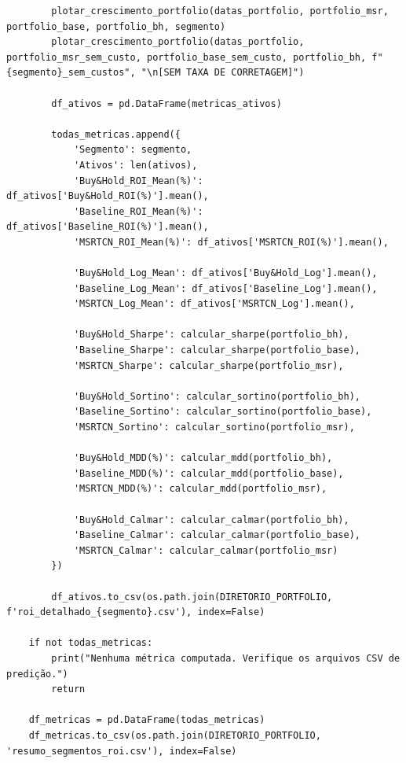 \documentclass{article}
\begin{document}
\begin{verbatim}
        plotar_crescimento_portfolio(datas_portfolio, portfolio_msr, portfolio_base, portfolio_bh, segmento)
        plotar_crescimento_portfolio(datas_portfolio, portfolio_msr_sem_custo, portfolio_base_sem_custo, portfolio_bh, f"{segmento}_sem_custos", "\n[SEM TAXA DE CORRETAGEM]")
        
        df_ativos = pd.DataFrame(metricas_ativos)
        
        todas_metricas.append({
            'Segmento': segmento,
            'Ativos': len(ativos),
            'Buy&Hold_ROI_Mean(%)': df_ativos['Buy&Hold_ROI(%)'].mean(),
            'Baseline_ROI_Mean(%)': df_ativos['Baseline_ROI(%)'].mean(),
            'MSRTCN_ROI_Mean(%)': df_ativos['MSRTCN_ROI(%)'].mean(),
            
            'Buy&Hold_Log_Mean': df_ativos['Buy&Hold_Log'].mean(),
            'Baseline_Log_Mean': df_ativos['Baseline_Log'].mean(),
            'MSRTCN_Log_Mean': df_ativos['MSRTCN_Log'].mean(),
            
            'Buy&Hold_Sharpe': calcular_sharpe(portfolio_bh),
            'Baseline_Sharpe': calcular_sharpe(portfolio_base),
            'MSRTCN_Sharpe': calcular_sharpe(portfolio_msr),
            
            'Buy&Hold_Sortino': calcular_sortino(portfolio_bh),
            'Baseline_Sortino': calcular_sortino(portfolio_base),
            'MSRTCN_Sortino': calcular_sortino(portfolio_msr),
            
            'Buy&Hold_MDD(%)': calcular_mdd(portfolio_bh),
            'Baseline_MDD(%)': calcular_mdd(portfolio_base),
            'MSRTCN_MDD(%)': calcular_mdd(portfolio_msr),
            
            'Buy&Hold_Calmar': calcular_calmar(portfolio_bh),
            'Baseline_Calmar': calcular_calmar(portfolio_base),
            'MSRTCN_Calmar': calcular_calmar(portfolio_msr)
        })
        
        df_ativos.to_csv(os.path.join(DIRETORIO_PORTFOLIO, f'roi_detalhado_{segmento}.csv'), index=False)
        
    if not todas_metricas:
        print("Nenhuma métrica computada. Verifique os arquivos CSV de predição.")
        return

    df_metricas = pd.DataFrame(todas_metricas)
    df_metricas.to_csv(os.path.join(DIRETORIO_PORTFOLIO, 'resumo_segmentos_roi.csv'), index=False)
    

\end{verbatim}
\end{document}

